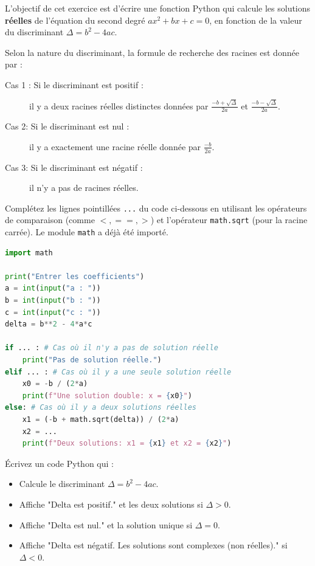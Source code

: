 \begin{Exercise}[title={Résolution d'une équation du second degré}]

L'objectif de cet exercice est d'écrire une fonction Python qui calcule les solutions \textbf{réelles} de l'équation du second degré $ax^2 + bx + c = 0$, en fonction de la valeur du discriminant $\Delta = b^2 - 4ac$.

Selon la nature du discriminant, la formule de recherche des racines est donnée par :
\begin{description}
    \item[Cas 1 : Si le discriminant est positif :] il y a deux racines réelles distinctes données par $\frac{-b+\sqrt{\Delta}}{2a}$ et $\frac{-b-\sqrt{\Delta}}{2a}$.
    \item[Cas 2: Si le discriminant est nul :] il y a exactement une racine réelle donnée par $\frac{-b}{2a}$.
    \item[Cas 3: Si le discriminant est négatif :] il n'y a pas de racines réelles.
\end{description}

\Question
Complétez les lignes pointillées \texttt{...} du code ci-dessous en utilisant les opérateurs de comparaison (comme $<, ==, >$) et l'opérateur \texttt{math.sqrt} (pour la racine carrée). Le module \texttt{math} a déjà été importé.

\begin{lstlisting}[style=pythonstyle, language=Python]
import math

print("Entrer les coefficients")
a = int(input("a : "))
b = int(input("b : "))
c = int(input("c : "))
delta = b**2 - 4*a*c

if ... : # Cas où il n'y a pas de solution réelle
    print("Pas de solution réelle.")
elif ... : # Cas où il y a une seule solution réelle
    x0 = -b / (2*a)
    print(f"Une solution double: x = {x0}")
else: # Cas où il y a deux solutions réelles
    x1 = (-b + math.sqrt(delta)) / (2*a)
    x2 = ...
    print(f"Deux solutions: x1 = {x1} et x2 = {x2}")
\end{lstlisting}

\Question
Écrivez un code Python qui :
\begin{itemize}
    \item Calcule le discriminant $\Delta = b^2 - 4ac$.
    \item Affiche "Delta est positif." et les deux solutions si $\Delta > 0$.
    \item Affiche "Delta est nul." et la solution unique si $\Delta = 0$.
    \item Affiche "Delta est négatif. Les solutions sont complexes (non réelles)." si $\Delta < 0$.
\end{itemize}

\end{Exercise}

